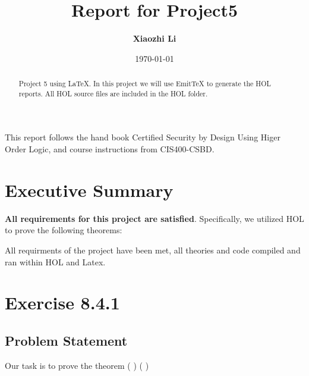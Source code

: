 \documentclass{report}
\title{Report for Project5}
\author{\textbf{Xiaozhi Li}}
\date{\today}
\begin{document}
\lstset{language=ML}


\maketitle{}

\begin{abstract}
  Project 5 using \LaTeX{}. In this project we will use EmitTeX to generate the HOL reports. All HOL source files are included in the HOL folder.
 \end{abstract}

\begin{acknowledgments}
 This report follows the hand book Certified Security by Design Using Higer Order Logic, and course instructions from CIS400-CSBD.
\end{acknowledgments}


\tableofcontents{}

\chapter{Executive Summary}


\textbf{All requirements for this project are satisfied}.
Specifically, we utilized HOL to prove the following theorems:
\begin{quote}
\HOLprojFiveTheorems
\end{quote}

All requirments of the project have been met, all theories and code compiled and ran within HOL and Latex.


\chapter{Exercise 8.4.1}
\label{cha:exercise-8.4.1}

\section{Problem Statement}
\label{sec:problem-statement}
Our task is to prove the theorem
\HOLTokenTurnstile{}  \HOLSymConst{\HOLTokenImp{}} ( \HOLSymConst{\HOLTokenImp{}} ) \HOLSymConst{\HOLTokenImp{}} ( \HOLSymConst{\HOLTokenImp{}} ) \HOLSymConst{\HOLTokenImp{}} 
\end{document}
